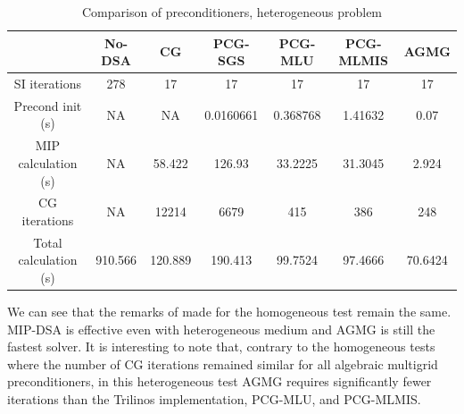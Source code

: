 \begin{table}[H]
  \begin{center}
    \caption{Comparison of preconditioners, heterogeneous problem}
    \begin{tabular}{|c|c|c|c|c|c|c|}
      \hline
      & No-DSA & CG & PCG-SGS & PCG-MLU & PCG-MLMIS & AGMG\\
      \hline
      SI iterations & 278     & 17      & 17        & 17       & 17      & 17  \\
   Precond init (s) & NA      & NA      & 0.0160661 & 0.368768 & 1.41632 &
      0.07  \\
MIP calculation (s) & NA      & 58.422  & 126.93    & 33.2225  & 31.3045 &
      2.924 \\
      CG iterations & NA      & 12214   & 6679      & 415      & 386     & 248  \\
Total calculation (s) & 910.566 & 120.889 & 190.413 & 99.7524  & 97.4666 &
      70.6424 \\      
      \hline
    \end{tabular}
    \label{comparison_hex}
  \end{center}
\end{table}
We can see that the remarks of  made for the homogeneous test
remain the same. MIP-DSA is effective even with heterogeneous medium and AGMG is
still the fastest solver. It is interesting to note that, contrary to the
homogeneous tests where the number of CG iterations remained similar for all
algebraic multigrid preconditioners, in this heterogeneous test AGMG requires
significantly fewer iterations than the Trilinos implementation, PCG-MLU, 
and PCG-MLMIS.

